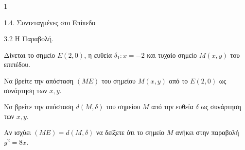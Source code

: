 \begin{ylh}{1}
    \item 1.4. Συντεταγμένες στο Επίπεδο
    \item 3.2 Η Παραβολή.
\end{ylh}
Δίνεται το σημείο $E(2,0)$, η ευθεία $\delta_1: x = -2$ και τυχαίο σημείο $M(x,y)$ του επιπέδου.
\begin{alist}
\item
    \begin{rlist}
    \item Να βρείτε την απόσταση $(ME)$ του σημείου $M(x,y)$ από το $E(2,0)$ ως συνάρτηση των $x, y$. 
    \item Να βρείτε την απόσταση $d(M,\delta)$ του σημείου $M$ από την ευθεία $\delta$ ως συνάρτηση των $x, y$. 
    \end{rlist}
\item Αν ισχύει $(ME) = d(M,\delta)$ να δείξετε ότι το σημείο $M$ ανήκει στην παραβολή $y^2 = 8x$. 
\end{alist}